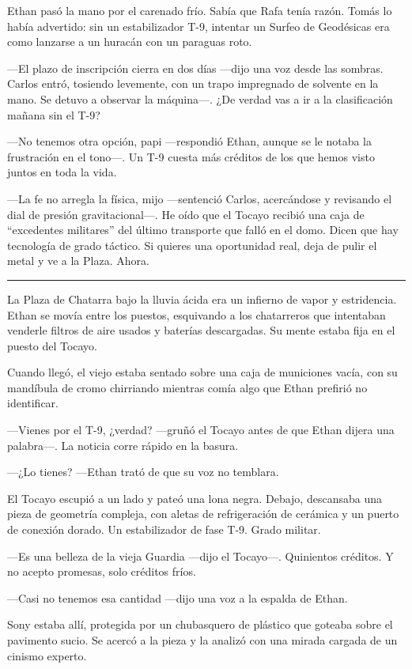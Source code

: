 \documentclass[12pt,a4paper]{book}
\begin{document}
Ethan pasó la mano por el carenado frío. Sabía que Rafa tenía razón. Tomás lo había advertido: sin un estabilizador T-9, intentar un Surfeo de Geodésicas era como lanzarse a un huracán con un paraguas roto.

---El plazo de inscripción cierra en dos días ---dijo una voz desde las sombras. Carlos entró, tosiendo levemente, con un trapo impregnado de solvente en la mano. Se detuvo a observar la máquina---. ¿De verdad vas a ir a la clasificación mañana sin el T-9?

---No tenemos otra opción, papi ---respondió Ethan, aunque se le notaba la frustración en el tono---. Un T-9 cuesta más créditos de los que hemos visto juntos en toda la vida.

---La fe no arregla la física, mijo ---sentenció Carlos, acercándose y revisando el dial de presión gravitacional---. He oído que el Tocayo recibió una caja de ``excedentes militares'' del último transporte que falló en el domo. Dicen que hay tecnología de grado táctico. Si quieres una oportunidad real, deja de pulir el metal y ve a la Plaza. Ahora.

\bigskip
\noindent\rule{\textwidth}{0.4pt}
\bigskip

La Plaza de Chatarra bajo la lluvia ácida era un infierno de vapor y estridencia. Ethan se movía entre los puestos, esquivando a los chatarreros que intentaban venderle filtros de aire usados y baterías descargadas. Su mente estaba fija en el puesto del Tocayo.

Cuando llegó, el viejo estaba sentado sobre una caja de municiones vacía, con su mandíbula de cromo chirriando mientras comía algo que Ethan prefirió no identificar.

---Vienes por el T-9, ¿verdad? ---gruñó el Tocayo antes de que Ethan dijera una palabra---. La noticia corre rápido en la basura.

---¿Lo tienes? ---Ethan trató de que su voz no temblara.

El Tocayo escupió a un lado y pateó una lona negra. Debajo, descansaba una pieza de geometría compleja, con aletas de refrigeración de cerámica y un puerto de conexión dorado. Un estabilizador de fase T-9. Grado militar.

---Es una belleza de la vieja Guardia ---dijo el Tocayo---. Quinientos créditos. Y no acepto promesas, solo créditos fríos.

---Casi no tenemos esa cantidad ---dijo una voz a la espalda de Ethan.

Sony estaba allí, protegida por un chubasquero de plástico que goteaba sobre el pavimento sucio. Se acercó a la pieza y la analizó con una mirada cargada de un cinismo experto.
\end{document}
